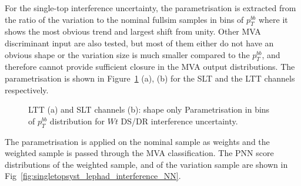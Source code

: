 
For the single-top interference uncertainty, the parametrisation 
is extracted from the ratio of the variation to the nominal fullsim samples
in bins of $p_T^{bb}$ where it shows the most obvious trend and largest shift from unity.
Other MVA discriminant input are also tested, but most of them either do not have an obvious shape
or the variation size is much smaller compared to the $p_T^{bb}$, and therefore cannot 
provide sufficient closure in the MVA output distributions. 
The parametrisation is shown in Figure~\ref{fig:singletopsyst_lephad_interference_pTBB} 
(a), (b) for the SLT and the LTT channels respectively.
\begin{figure}
\centering
{}
\caption{LTT (a) and SLT channels (b): shape only Parametrisation in bins of $p_T^{bb}$ distribution for $Wt$ DS/DR interference uncertainty.}
\label{fig:singletopsyst_lephad_interference_pTBB}
\end{figure}
The parametrisation is applied on the nominal sample as weights and the weighted sample
is passed through the MVA classification. 
The PNN score distributions of the weighted sample, and of the variation
sample are shown in Fig~\ref{fig:singletopsyst_lephad_interference_NN}. 
